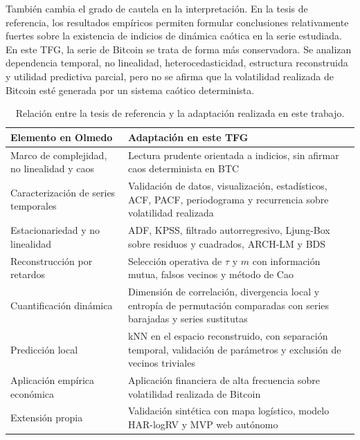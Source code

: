 También cambia el grado de cautela en la interpretación. En la tesis de referencia, los resultados empíricos permiten formular conclusiones relativamente fuertes sobre la existencia de indicios de dinámica caótica en la serie estudiada. En este TFG, la serie de Bitcoin se trata de forma más conservadora. Se analizan dependencia temporal, no linealidad, heterocedasticidad, estructura reconstruida y utilidad predictiva parcial, pero no se afirma que la volatilidad realizada de Bitcoin esté generada por un sistema caótico determinista.

\begin{table}[ht]
\centering
\begin{tabular}{p{}p{}}
\toprule %
\textbf{Elemento en Olmedo} & \textbf{Adaptación en este TFG} \\
\toprule
Marco de complejidad, no linealidad y caos & Lectura prudente orientada a indicios, sin afirmar caos determinista en BTC \\ \midrule[0.2pt]
Caracterización de series temporales & Validación de datos, visualización, estadísticos, ACF, PACF, periodograma y recurrencia sobre volatilidad realizada \\ \midrule[0.2pt]
Estacionariedad y no linealidad & ADF, KPSS, filtrado autorregresivo, Ljung-Box sobre residuos y cuadrados, ARCH-LM y BDS \\ \midrule[0.2pt]
Reconstrucción por retardos & Selección operativa de \(\tau\) y \(m\) con información mutua, falsos vecinos y método de Cao \\ \midrule[0.2pt]
Cuantificación dinámica & Dimensión de correlación, divergencia local y entropía de permutación comparadas con series barajadas y series sustitutas \\ \midrule[0.2pt]
Predicción local & kNN en el espacio reconstruido, con separación temporal, validación de parámetros y exclusión de vecinos triviales \\ \midrule[0.2pt]
Aplicación empírica económica & Aplicación financiera de alta frecuencia sobre volatilidad realizada de Bitcoin \\ \midrule[0.2pt]
Extensión propia & Validación sintética con mapa logístico, modelo HAR-logRV y MVP web autónomo \\
\bottomrule %
\end{tabular}
\caption{Relación entre la tesis de referencia y la adaptación realizada en este trabajo.}
\label{tab:relacion-olmedo-tfg}
\end{table}


